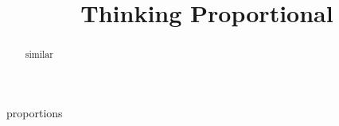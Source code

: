 \documentclass{ximera}
\title{Thinking Proportional}
\begin{document}
\begin{abstract}
similar
\end{abstract}
\maketitle



proportions
\end{document}
